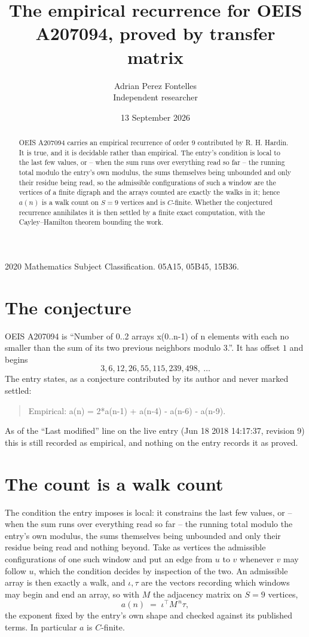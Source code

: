 \documentclass[11pt,a4paper]{article}
\title{The empirical recurrence for OEIS A207094, proved by transfer matrix}
\author{Adrian Perez Fontelles\\ \small Independent researcher}
\date{13 September 2026}
\theoremstyle{plain}
\theoremstyle{definition}
\begin{document}
\maketitle

\begin{abstract}
OEIS A207094 carries an empirical recurrence of order $9$ contributed by R. H. Hardin. It is
true, and it is decidable rather than empirical. The entry's condition is local to the last few values, or -- when the sum runs over everything read so far -- the running total modulo the entry's own modulus, the sums themselves being unbounded and only their residue being read, so
the admissible configurations of such a window are the vertices of a finite digraph and the
arrays counted are exactly the walks in it; hence $a(n)$ is a walk count on $S=9$ vertices
and is $C$-finite. Whether the conjectured recurrence annihilates it is then settled by a
finite exact computation, with the Cayley--Hamilton theorem bounding the work.
\end{abstract}

\noindent\small 2020 Mathematics Subject Classification. 05A15, 05B45, 15B36.\normalsize

\section{The conjecture}

OEIS A207094 is ``Number of 0..2 arrays x(0..n-1) of n elements with each no smaller than the sum of its two previous neighbors modulo 3.''. It has offset $1$ and begins
\[
3, 6, 12, 26, 55, 115, 239, 498,\ \dots
\]
The entry states, as a conjecture contributed by its author and never marked settled:
\begin{quote}
Empirical: a(n) = 2*a(n-1) + a(n-4) - a(n-6) - a(n-9).
\end{quote}
As of the ``Last modified'' line on the live entry (Jun 18 2018 14:17:37, revision 9) this is still
recorded as empirical, and nothing on the entry records it as proved.

\section{The count is a walk count}

The condition the entry imposes is local: it constrains the last few values, or -- when the sum runs over everything read so far -- the running total modulo the entry's own modulus, the sums themselves being unbounded and only their residue being read and nothing beyond. Take as vertices the admissible configurations of one such window and put an edge from $u$ to $v$ whenever $v$ may follow $u$, which the condition decides by inspection of the two.
An admissible array is then exactly a walk, and $\iota,\tau$ are the vectors recording which windows may begin and end an array, so with $M$ the adjacency matrix on $S=9$ vertices,
\[
a(n)\;=\;\iota^{\!\top}M^{\,n}\tau ,
\]
the exponent fixed by the entry's own shape and checked against its published terms. In
particular $a$ is $C$-finite.
\end{document}
